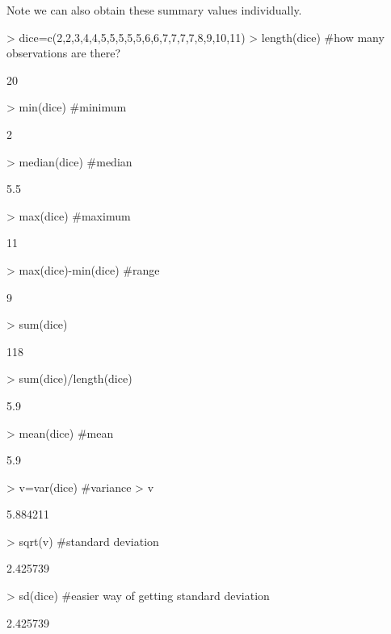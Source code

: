 \documentclass[12pt]{article}
\begin{document}
Note we can also obtain these summary values individually.
\begin{Schunk}
\begin{Sinput}
> dice=c(2,2,3,4,4,5,5,5,5,5,6,6,7,7,7,7,8,9,10,11)
> length(dice) #how many observations are there?
\end{Sinput}
\begin{Soutput}
[1] 20
\end{Soutput}
\begin{Sinput}
> min(dice) #minimum
\end{Sinput}
\begin{Soutput}
[1] 2
\end{Soutput}
\begin{Sinput}
> median(dice) #median
\end{Sinput}
\begin{Soutput}
[1] 5.5
\end{Soutput}
\begin{Sinput}
> max(dice) #maximum
\end{Sinput}
\begin{Soutput}
[1] 11
\end{Soutput}
\begin{Sinput}
> max(dice)-min(dice) #range
\end{Sinput}
\begin{Soutput}
[1] 9
\end{Soutput}
\begin{Sinput}
> sum(dice)
\end{Sinput}
\begin{Soutput}
[1] 118
\end{Soutput}
\begin{Sinput}
> sum(dice)/length(dice)
\end{Sinput}
\begin{Soutput}
[1] 5.9
\end{Soutput}
\begin{Sinput}
> mean(dice) #mean
\end{Sinput}
\begin{Soutput}
[1] 5.9
\end{Soutput}
\begin{Sinput}
> v=var(dice) #variance
> v
\end{Sinput}
\begin{Soutput}
[1] 5.884211
\end{Soutput}
\begin{Sinput}
> sqrt(v) #standard deviation
\end{Sinput}
\begin{Soutput}
[1] 2.425739
\end{Soutput}
\begin{Sinput}
> sd(dice) #easier way of getting standard deviation
\end{Sinput}
\begin{Soutput}
[1] 2.425739
\end{Soutput}
\end{Schunk}
\end{document}
